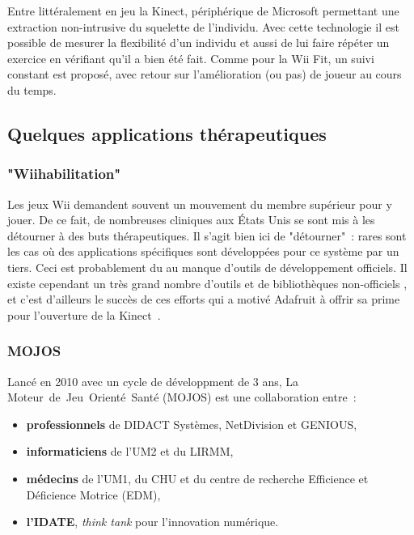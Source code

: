 Entre littéralement en jeu la Kinect, périphérique de Microsoft permettant une
extraction non-intrusive du squelette de l'individu. Avec cette technologie
il est possible de mesurer la flexibilité d'un individu et aussi de lui faire répéter
un exercice en vérifiant qu'il a bien été fait. 
Comme pour la Wii Fit, un suivi constant est proposé, avec retour sur
l'amélioration (ou pas) de joueur au cours du temps.



\subsection{Quelques applications thérapeutiques}

\subsubsection{"Wiihabilitation"}

Les jeux Wii demandent souvent un mouvement du membre supérieur pour y 
jouer. De ce fait, de nombreuses 
cliniques aux États Unis se sont mis à les détourner à des buts 
thérapeutiques\cite{atwiki_wiihab}. Il s'agit bien ici de "détourner"~: rares sont les cas où des
applications spécifiques sont développées pour ce système par un tiers. Ceci
est probablement du au manque d'outils de développement officiels. Il existe
cependant un très grand nombre d'outils et de bibliothèques non-officiels
\cite{homebrew_wii}, et
c'est d'ailleurs le succès de ces efforts qui a motivé Adafruit à offrir sa prime
pour l'ouverture de la Kinect~\cite{adafruit_bounty}.

\subsubsection{MOJOS}
Lancé en 2010 avec un cycle de développment de 3 ans, 
La Moteur~de~Jeu~Orienté~Santé (MOJOS) est une collaboration entre~:
\begin{itemize}
\item \textbf{professionnels} de DIDACT Systèmes, NetDivision et GENIOUS,
\item \textbf{informaticiens} de l'UM2 et du LIRMM,
\item \textbf{médecins} de l'UM1, du CHU et du centre 
de recherche Efficience et Déficience Motrice (EDM),
\item \textbf{l'IDATE}, \emph{think tank} pour l'innovation numérique.
\end{itemize}

